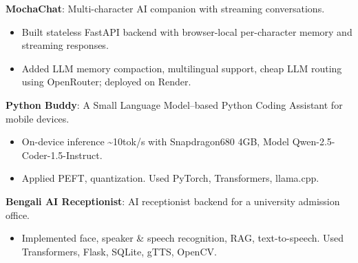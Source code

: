 
\begin{cvlistsection}

\item \textbf{MochaChat}: Multi-character AI companion with streaming conversations.
\href{https://mocha-chat.onrender.com/}{\textcolor{Cerulean}{\faExternalLink*}}
\begin{itemize}[leftmargin=2.5em, nosep, noitemsep]
  \item[\textendash] Built stateless FastAPI backend with browser-local per-character memory and streaming responses.
  \item[\textendash] Added LLM memory compaction, multilingual support, cheap LLM routing using OpenRouter; deployed on Render.
\end{itemize}

\item \textbf{Python Buddy}: A Small Language Model–based Python Coding Assistant for mobile devices.
\href{https://github.com/2ufiq/slm-python-buddy}{\faGithub}
\begin{itemize}[leftmargin=2.5em, nosep, noitemsep]
  \item[\textendash] On-device inference \~{}10tok/s with Snapdragon680 4GB, Model Qwen-2.5-Coder-1.5-Instruct. 
  \item[\textendash] Applied PEFT, quantization. Used PyTorch, Transformers, llama.cpp.
\end{itemize}

\item \textbf{Bengali AI Receptionist}: AI receptionist backend for a university admission office.
\href{https://github.com/2ufiq/Bengali-AI-Recieptionist}{\faGithub}
\begin{itemize}[leftmargin=2.5em, nosep, noitemsep]
  \item[\textendash] Implemented face, speaker \& speech recognition, RAG, text-to-speech. Used Transformers, Flask, SQLite, gTTS, OpenCV.
\end{itemize}
\end{cvlistsection}
